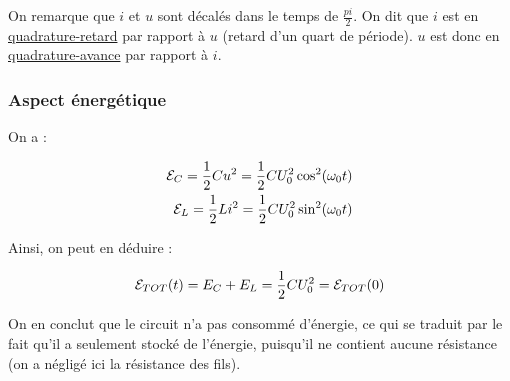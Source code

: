 \documentclass{article}
\begin{document}
On remarque que $i$ et $u$ sont décalés dans le temps de $\frac{pi}{2}$. On dit que $i$ est en \underline{quadrature-retard} par rapport à $u$ (retard d'un quart de période). $u$ est donc en \underline{quadrature-avance} par rapport à $i$.


\subsubsection{Aspect énergétique}

On a :

\begin{align*}\begin{split}
\mathcal{E}_C=\frac{1}{2}Cu^2=\frac{1}{2}CU_0^2\cos^2(\omega_0t)\\
\mathcal{E}_L=\frac{1}{2}Li^2=\frac{1}{2}CU_0^2\sin^2(\omega_0t)\\
\end{split}\end{align*}

Ainsi, on peut en déduire :

\begin{align*}\begin{split}
\mathcal{E}_{TOT}(t)=E_C+E_L=\frac{1}{2}CU_0^2=\mathcal{E}_{TOT}(0)
\end{split}\end{align*}

On en conclut que le circuit n'a pas consommé d'énergie, ce qui se traduit par le fait qu'il a seulement stocké de l'énergie, puisqu'il ne contient aucune résistance (on a négligé ici la résistance des fils).
\end{document}
